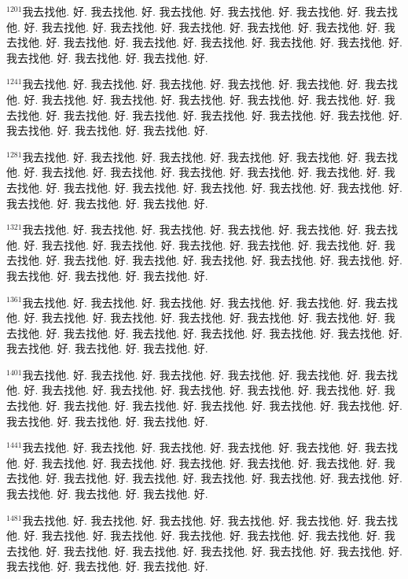\documentclass{book}
\begin{document}
$^{1201}$我去找他.
好.
我去找他.
好.
我去找他.
好.
我去找他.
好.
我去找他.
好.
我去找他.
好.
我去找他.
好.
我去找他.
好.
我去找他.
好.
我去找他.
好.
我去找他.
好.
我去找他.
好.
我去找他.
好.
我去找他.
好.
我去找他.
好.
我去找他.
好.
我去找他.
好.
我去找他.
好.
我去找他.
好.
我去找他.
好.

$^{1241}$我去找他.
好.
我去找他.
好.
我去找他.
好.
我去找他.
好.
我去找他.
好.
我去找他.
好.
我去找他.
好.
我去找他.
好.
我去找他.
好.
我去找他.
好.
我去找他.
好.
我去找他.
好.
我去找他.
好.
我去找他.
好.
我去找他.
好.
我去找他.
好.
我去找他.
好.
我去找他.
好.
我去找他.
好.
我去找他.
好.

$^{1281}$我去找他.
好.
我去找他.
好.
我去找他.
好.
我去找他.
好.
我去找他.
好.
我去找他.
好.
我去找他.
好.
我去找他.
好.
我去找他.
好.
我去找他.
好.
我去找他.
好.
我去找他.
好.
我去找他.
好.
我去找他.
好.
我去找他.
好.
我去找他.
好.
我去找他.
好.
我去找他.
好.
我去找他.
好.
我去找他.
好.

$^{1321}$我去找他.
好.
我去找他.
好.
我去找他.
好.
我去找他.
好.
我去找他.
好.
我去找他.
好.
我去找他.
好.
我去找他.
好.
我去找他.
好.
我去找他.
好.
我去找他.
好.
我去找他.
好.
我去找他.
好.
我去找他.
好.
我去找他.
好.
我去找他.
好.
我去找他.
好.
我去找他.
好.
我去找他.
好.
我去找他.
好.

$^{1361}$我去找他.
好.
我去找他.
好.
我去找他.
好.
我去找他.
好.
我去找他.
好.
我去找他.
好.
我去找他.
好.
我去找他.
好.
我去找他.
好.
我去找他.
好.
我去找他.
好.
我去找他.
好.
我去找他.
好.
我去找他.
好.
我去找他.
好.
我去找他.
好.
我去找他.
好.
我去找他.
好.
我去找他.
好.
我去找他.
好.

$^{1401}$我去找他.
好.
我去找他.
好.
我去找他.
好.
我去找他.
好.
我去找他.
好.
我去找他.
好.
我去找他.
好.
我去找他.
好.
我去找他.
好.
我去找他.
好.
我去找他.
好.
我去找他.
好.
我去找他.
好.
我去找他.
好.
我去找他.
好.
我去找他.
好.
我去找他.
好.
我去找他.
好.
我去找他.
好.
我去找他.
好.

$^{1441}$我去找他.
好.
我去找他.
好.
我去找他.
好.
我去找他.
好.
我去找他.
好.
我去找他.
好.
我去找他.
好.
我去找他.
好.
我去找他.
好.
我去找他.
好.
我去找他.
好.
我去找他.
好.
我去找他.
好.
我去找他.
好.
我去找他.
好.
我去找他.
好.
我去找他.
好.
我去找他.
好.
我去找他.
好.
我去找他.
好.

$^{1481}$我去找他.
好.
我去找他.
好.
我去找他.
好.
我去找他.
好.
我去找他.
好.
我去找他.
好.
我去找他.
好.
我去找他.
好.
我去找他.
好.
我去找他.
好.
我去找他.
好.
我去找他.
好.
我去找他.
好.
我去找他.
好.
我去找他.
好.
我去找他.
好.
我去找他.
好.
我去找他.
好.
我去找他.
好.
我去找他.
好.
\end{document}
